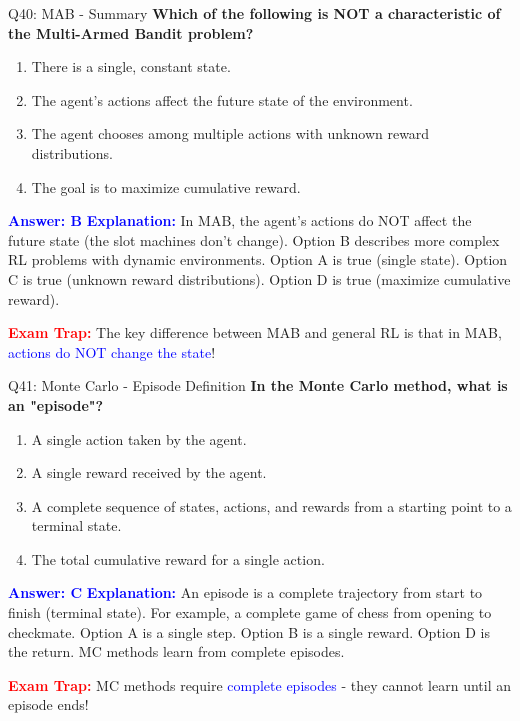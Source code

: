 \documentclass[8pt]{beamer}
\begin{document}
	\begin{frame}{Q40: MAB - Summary}
		\fontsize{6.5}{7.5}\selectfont
		\textbf{Which of the following is NOT a characteristic of the Multi-Armed Bandit problem?}
		
		\begin{enumerate}
			\item There is a single, constant state.
			\item The agent's actions affect the future state of the environment.
			\item The agent chooses among multiple actions with unknown reward distributions.
			\item The goal is to maximize cumulative reward.
		\end{enumerate}
		
		\vspace{0.1cm}
		\textcolor{blue}{\textbf{Answer: B}}
		\vspace{0.1cm}
		\textcolor{blue}{\textbf{Explanation:}} In MAB, the agent's actions do NOT affect the future state (the slot machines don't change). Option B describes more complex RL problems with dynamic environments. Option A is true (single state). Option C is true (unknown reward distributions). Option D is true (maximize cumulative reward).
		
		\textcolor{red}{\textbf{Exam Trap:}} The key difference between MAB and general RL is that in MAB, \textcolor{blue}{actions do NOT change the state}!
	\end{frame}
	
	
	\begin{frame}{Q41: Monte Carlo - Episode Definition}
		\fontsize{6.5}{7.5}\selectfont
		\textbf{In the Monte Carlo method, what is an "episode"?}
		
		\begin{enumerate}
			\item A single action taken by the agent.
			\item A single reward received by the agent.
			\item A complete sequence of states, actions, and rewards from a starting point to a terminal state.
			\item The total cumulative reward for a single action.
		\end{enumerate}
		
		\vspace{0.1cm}
		\textcolor{blue}{\textbf{Answer: C}}
		\vspace{0.1cm}
		\textcolor{blue}{\textbf{Explanation:}} An episode is a complete trajectory from start to finish (terminal state). For example, a complete game of chess from opening to checkmate. Option A is a single step. Option B is a single reward. Option D is the return. MC methods learn from complete episodes.
		
		\textcolor{red}{\textbf{Exam Trap:}} MC methods require \textcolor{blue}{complete episodes} - they cannot learn until an episode ends!
	\end{frame}
	
\end{document}
